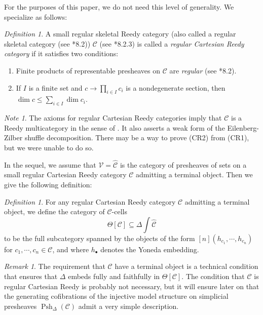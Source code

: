 \documentclass[leqno]{article}
\numberwithin{equation}{subsection}
\theoremstyle{plain}   %
\theoremstyle{remark}
\newtheorem{rem}[equation]{Remark}
\newtheorem{note}[equation]{Note}
\newtheorem{defn}[equation]{Definition}
\theoremstyle{plain}
\newcommand{\psh}[1]{\ensuremath{\widehat{#1}}}
\providecommand{\C}{}
\renewcommand{\C}{\ensuremath{\mathcal{C}}}
\newcommand{\spsh}{\ensuremath{\operatorname{Psh}_\Delta(\mathcal{C})}}
\begin{document}
For the purposes of this paper, we do not need this level of generality.  We specialize as follows: 

\begin{defn}\label{cishelp}
	A small regular skeletal Reedy category (also called a regular skeletal category (see \cite{cisinski-book}*{8.2})) \(\C\) (see \cite{cisinski-book}*{8.2.3}) is called a \emph{regular Cartesian Reedy category} if it satisfies two conditions:

	\begin{enumerate}[\indent(CR1)]
		\item Finite products of representable presheaves on \(\C\) are \emph{regular} (see \cite{cisinski-book}*{8.2}).
		\item If \(I\) is a finite set and \(c\to \prod\limits_{i\in I }c_i \) is a nondegenerate section, then \(\dim c \leq \sum\limits_{i\in I}\dim c_i\).
	\end{enumerate}
\end{defn}

\begin{note}
	The axioms for regular Cartesian Reedy categories imply that \(\C\) is a Reedy multicategory in the sense of \cite{bergner-rezk-reedy}.  It also asserts a weak form of the Eilenberg-Zilber shuffle decomposition. There may be a way to prove (CR2) from (CR1), but we were unable to do so.
\end{note}

In the sequel, we assume that \(\mathcal{V}=\psh{\C}\) is the category of presheaves of sets on a small regular Cartesian Reedy category \(\C\) admitting a terminal object.  Then we give the following definition:

\begin{defn} For any regular Cartesian Reedy category \(\C\) admitting a terminal object, we define the category of \(\C\)-cells
	\[\Theta[\C]\subseteq \Delta \int \psh{\C}\]
	to be the full subcategory spanned by the objects of the form \([n](h_{c_1},\cdots, h_{c_n})\) for \(c_1,\cdots, c_n \in \C\), and where \(h_\bullet\) denotes the Yoneda embedding.
\end{defn}

\begin{rem} The requirement that \(\C\) have a terminal object is a technical condition that ensures that \(\Delta\) embeds fully and faithfully in \(\Theta[\C]\).  The condition that \(\C\) is regular Cartesian Reedy is probably not necessary, but it will ensure later on that the generating cofibrations of the injective model structure on simplicial presheaves \(\spsh\) admit a very simple description.
\end{rem}
\end{document}
